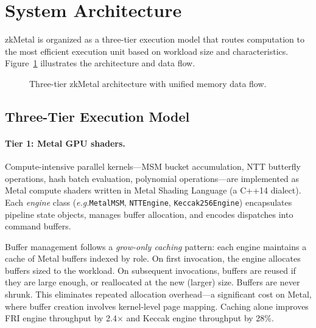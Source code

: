 \documentclass[letterpaper,twocolumn,10pt]{article}
\newcommand{\sys}{zkMetal\xspace}
\newcommand{\eg}{\textit{e.g.}\xspace}
\begin{document}
\section{System Architecture}
\label{sec:architecture}

\sys is organized as a three-tier execution model that routes computation to
the most efficient execution unit based on workload size and characteristics.
Figure~\ref{fig:architecture} illustrates the architecture and data flow.

\begin{figure}[t]
\centering
\caption{Three-tier \sys architecture with unified memory data flow.}
\label{fig:architecture}
\end{figure}

\subsection{Three-Tier Execution Model}
\label{sec:tiers}

\paragraph{Tier 1: Metal GPU shaders.} Compute-intensive parallel
kernels---MSM bucket accumulation, NTT butterfly operations, hash batch
evaluation, polynomial operations---are implemented as Metal compute
shaders written in Metal Shading Language (a C++14 dialect). Each
\emph{engine} class (\eg \texttt{MetalMSM}, \texttt{NTTEngine},
\texttt{Keccak256Engine}) encapsulates pipeline state objects, manages
buffer allocation, and encodes dispatches into command buffers.

Buffer management follows a \emph{grow-only caching} pattern: each engine
maintains a cache of Metal buffers indexed by role. On first invocation, the
engine allocates buffers sized to the workload. On subsequent invocations,
buffers are reused if they are large enough, or reallocated at the new
(larger) size. Buffers are never shrunk. This eliminates repeated allocation
overhead---a significant cost on Metal, where buffer creation involves
kernel-level page mapping. Caching alone improves FRI engine throughput by
2.4$\times$ and Keccak engine throughput by 28\%.
\end{document}
